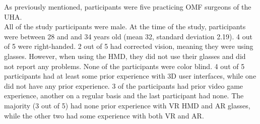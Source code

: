 As previously mentioned, participants were five practicing OMF surgeons of the UHA.
\\ All of the study participants were male.
At the time of the study, participants were between 28 and and 34 years old (mean 32, standard deviation 2.19).
4 out of 5 were right-handed.
2 out of 5 had corrected vision, meaning they were using glasses.
However, when using the HMD, they did not use their glasses and did not report any problems.
None of the participants were color blind.
4 out of 5 participants had at least some prior experience with 3D user interfaces, while one did not have any prior experience.
3 of the participants had prior video game experience, another on a regular basis and the last participant had none.
The majority (3 out of 5) had none prior experience with VR HMD and AR glasses, while the other two had some experience with both VR and AR.